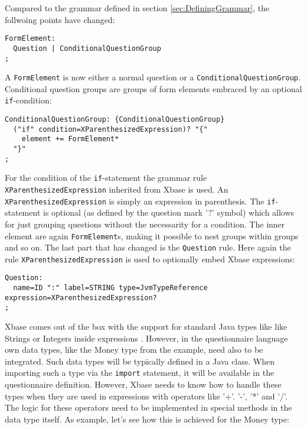 Compared to the grammar defined in section \ref{sec:DefiningGrammar}, the follwoing points have changed:


\begin{lstlisting}[language=Xtext]
FormElement:
  Question | ConditionalQuestionGroup
;
\end{lstlisting}

A \texttt{FormElement} is now either a normal question or a \texttt{ConditionalQuestionGroup}. Conditional
question groups are groups of form elements embraced by an optional \texttt{if}-condition:

\begin{lstlisting}[language=Xtext]
ConditionalQuestionGroup: {ConditionalQuestionGroup}
  ("if" condition=XParenthesizedExpression)? "{"
    element += FormElement*
  "}"
;
\end{lstlisting}

For the condition of the \texttt{if}-statement the grammar rule \texttt{XParenthesizedExpression} 
inherited from Xbase is used. An \texttt{XParenthesizedExpression} is simply an expression in parenthesis.
The \texttt{if}-statement is optional (as defined by the question mark '?' symbol) which allows for just
grouping questions without the necessarity for a condition. The inner element are again \texttt{FormElement}s,
making it possible to nest groups within groups and so on. The last part that has changed is the \texttt{Question}
rule. Here again the rule \texttt{XParenthesizedExpression} is used to optionally embed Xbase expressions:

\begin{lstlisting}[language=Xtext]
Question:
  name=ID ":" label=STRING type=JvmTypeReference expression=XParenthesizedExpression?
;
\end{lstlisting}

Xbase comes out of the box with the support for standard Java types like like Strings or Integers inside expressions .
However, in the questionnaire language own data types, like the Money type from the example, need also to be
integrated. Such data types will be typically defined in a Java class. When importing such a type via the \texttt{import}
statement, it will be available in the questionnaire definition. However, Xbase needs to know how to handle
these types when they are used in expressions with operators like '+'. '-', '*' and '/'. The logic for these
operators need to be implemented in special methods in the data type itself. As example, let's see how this
is achieved for the Money type:

